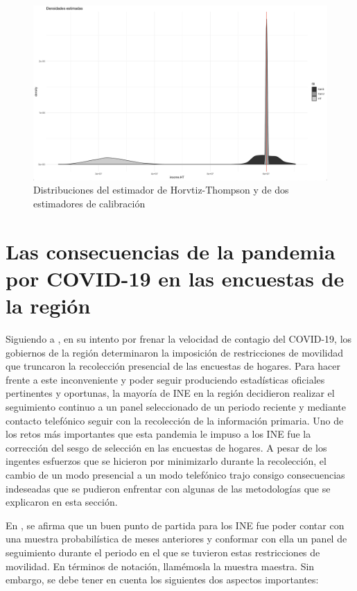 \documentclass[
  12pt,
]{book}
\begin{document}
\begin{figure}

{\centering \includegraphics[width=0.5\linewidth]{Pics/c12} 

}

\caption{Distribuciones del estimador de Horvtiz-Thompson y de dos estimadores de calibración}\label{fig:fightcal2dist}
\end{figure}

\hypertarget{las-consecuencias-de-la-pandemia-por-covid-19-en-las-encuestas-de-la-regiuxf3n}{%
\section{Las consecuencias de la pandemia por COVID-19 en las encuestas de la región}\label{las-consecuencias-de-la-pandemia-por-covid-19-en-las-encuestas-de-la-regiuxf3n}}

Siguiendo a \citet{CEPAL_sesgos2020}, en su intento por frenar la velocidad de contagio del COVID-19, los gobiernos de la región determinaron la imposición de restricciones de movilidad que truncaron la recolección presencial de las encuestas de hogares. Para hacer frente a este inconveniente y poder seguir produciendo estadísticas oficiales pertinentes y oportunas, la mayoría de INE en la región decidieron realizar el seguimiento continuo a un panel seleccionado de un periodo reciente y mediante contacto telefónico seguir con la recolección de la información primaria. Uno de los retos más importantes que esta pandemia le impuso a los INE fue la corrección del sesgo de selección en las encuestas de hogares. A pesar de los ingentes esfuerzos que se hicieron por minimizarlo durante la recolección, el cambio de un modo presencial a un modo telefónico trajo consigo consecuencias indeseadas que se pudieron enfrentar con algunas de las metodologías que se explicaron en esta sección.

En \citet{CEPAL_publica}, se afirma que un buen punto de partida para los INE fue poder contar con una muestra probabilística de meses anteriores y conformar con ella un panel de seguimiento durante el periodo en el que se tuvieron estas restricciones de movilidad. En términos de notación, llamémosla la muestra maestra. Sin embargo, se debe tener en cuenta los siguientes dos aspectos importantes:
\end{document}
